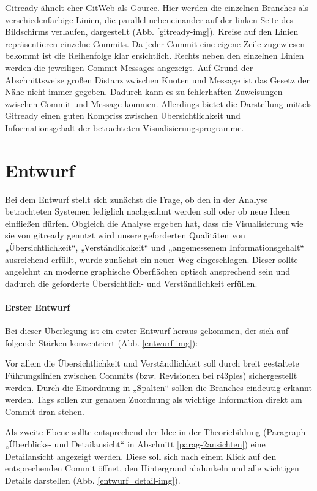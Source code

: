 \documentclass[color, ddc]{tudscrreprt}
\begin{document}
	Gitready ähnelt eher GitWeb als Gource. Hier werden die einzelnen Branches als verschiedenfarbige Linien, die parallel nebeneinander auf der linken Seite des Bildschirms verlaufen, dargestellt (Abb. \ref{gitready-img}). Kreise auf den Linien repräsentieren einzelne Commits. Da jeder Commit eine eigene Zeile zugewiesen bekommt ist die Reihenfolge klar ersichtlich. Rechts neben den einzelnen Linien werden die jeweiligen Commit-Messages angezeigt. Auf Grund der Abschnittsweise großen Distanz zwischen Knoten und Message ist das Gesetz der Nähe nicht immer gegeben. Dadurch kann es zu fehlerhaften Zuweisungen zwischen Commit und Message kommen. Allerdings bietet die Darstellung mittels Gitready einen guten Kompriss zwischen Übersichtlichkeit und Informationsgehalt der betrachteten Visualisierungsprogramme. 

\section{Entwurf}	

Bei dem Entwurf stellt sich zunächst die Frage, ob den in der Analyse betrachteten Systemen lediglich nachgeahmt werden soll oder ob neue Ideen einfließen dürfen. Obgleich die Analyse ergeben hat, dass die Visualisierung wie sie von gitready genutzt wird unsere geforderten Qualitäten von „Übersichtlichkeit“, „Verständlichkeit“ und „angemessenem Informationsgehalt“ ausreichend erfüllt, wurde zunächst ein neuer Weg eingeschlagen. Dieser sollte angelehnt an moderne graphische Oberflächen optisch ansprechend sein und dadurch die geforderte Übersichtlich- und Verständlichkeit erfüllen.

\paragraph{Erster Entwurf}
Bei dieser Überlegung ist ein erster Entwurf heraus gekommen, der sich auf folgende Stärken konzentriert (Abb. \ref{entwurf-img}):

Vor allem die Übersichtlichkeit und Verständlichkeit soll durch breit gestaltete Führungslinien zwischen Commits (bzw. Revisionen bei r43ples) sichergestellt werden. Durch die Einordnung in „Spalten“ sollen die Branches eindeutig erkannt werden. Tags sollen zur genauen Zuordnung als wichtige Information direkt am Commit dran stehen.

Als zweite Ebene sollte entsprechend der Idee in der Theoriebildung (Paragraph „Überblicks- und Detailansicht“ in Abschnitt \ref{parag-2ansichten}) eine Detailansicht angezeigt werden. Diese soll sich nach einem Klick auf den entsprechenden Commit öffnet, den Hintergrund abdunkeln und alle wichtigen Details darstellen (Abb. \ref{entwurf_detail-img}).
\end{document}
